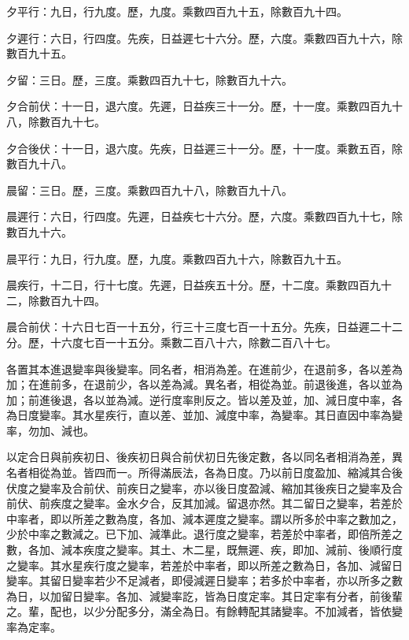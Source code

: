 \begin{pinyinscope}
 夕平行：九日，行九度。歷，九度。乘數四百九十五，除數百九十四。



 夕遲行：六日，行四度。先疾，日益遲七十六分。歷，六度。乘數四百九十六，除數百九十五。



 夕留：三日。歷，三度。乘數四百九十七，除數百九十六。



 夕合前伏：十一日，退六度。先遲，日益疾三十一分。歷，十一度。乘數四百九十八，除數百九十七。



 夕合後伏：十一日，退六度。先疾，日益遲三十一分。歷，十一度。乘數五百，除數百九十八。



 晨留：三日。歷，三度。乘數四百九十八，除數百九十八。



 晨遲行：六日，行四度。先遲，日益疾七十六分。歷，六度。乘數四百九十七，除數百九十六。



 晨平行：九日，行九度。歷，九度。乘數四百九十六，除數百九十五。



 晨疾行，十二日，行十七度。先遲，日益疾五十分。歷，十二度。乘數四百九十二，除數百九十四。



 晨合前伏：十六日七百一十五分，行三十三度七百一十五分。先疾，日益遲二十二分。歷，十六度七百一十五分。乘數二百八十六，除數二百八十七。



 各置其本進退變率與後變率。同名者，相消為差。在進前少，在退前多，各以差為加；在進前多，在退前少，各以差為減。異名者，相從為並。前退後進，各以並為加；前進後退，各以並為減。逆行度率則反之。皆以差及並，加、減日度中率，各為日度變率。其水星疾行，直以差、並加、減度中率，為變率。其日直因中率為變率，勿加、減也。



 以定合日與前疾初日、後疾初日與合前伏初日先後定數，各以同名者相消為差，異名者相從為並。皆四而一。所得滿辰法，各為日度。乃以前日度盈加、縮減其合後伏度之變率及合前伏、前疾日之變率，亦以後日度盈減、縮加其後疾日之變率及合前伏、前疾度之變率。金水夕合，反其加減。留退亦然。其二留日之變率，若差於中率者，即以所差之數為度，各加、減本遲度之變率。謂以所多於中率之數加之，少於中率之數減之。已下加、減準此。退行度之變率，若差於中率者，即倍所差之數，各加、減本疾度之變率。其土、木二星，既無遲、疾，即加、減前、後順行度之變率。其水星疾行度之變率，若差於中率者，即以所差之數為日，各加、減留日變率。其留日變率若少不足減者，即侵減遲日變率；若多於中率者，亦以所多之數為日，以加留日變率。各加、減變率訖，皆為日度定率。其日定率有分者，前後輩之。輩，配也，以少分配多分，滿全為日。有餘轉配其諸變率。不加減者，皆依變率為定率。




\end{pinyinscope}
